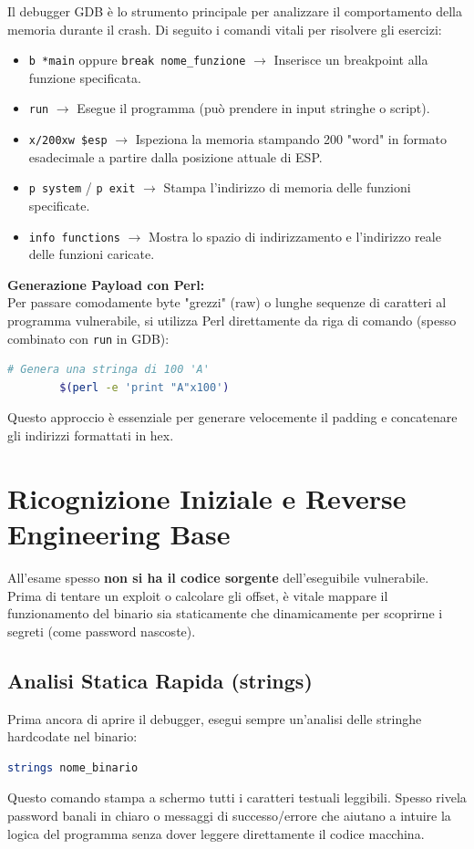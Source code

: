 \documentclass[12pt,a4paper]{report}
\begin{document}
	Il debugger GDB è lo strumento principale per analizzare il comportamento della memoria durante il crash. Di seguito i comandi vitali per risolvere gli esercizi:
	\begin{itemize}
		\item \texttt{b *main} oppure \texttt{break nome\_funzione} $\rightarrow$ Inserisce un breakpoint alla funzione specificata.
		\item \texttt{run} $\rightarrow$ Esegue il programma (può prendere in input stringhe o script).
		\item \texttt{x/200xw \$esp} $\rightarrow$ Ispeziona la memoria stampando 200 "word" in formato esadecimale a partire dalla posizione attuale di ESP.
		\item \texttt{p system} / \texttt{p exit} $\rightarrow$ Stampa l'indirizzo di memoria delle funzioni specificate.
		\item \texttt{info functions} $\rightarrow$ Mostra lo spazio di indirizzamento e l'indirizzo reale delle funzioni caricate.
	\end{itemize}
	\textbf{Generazione Payload con Perl:}\\
	Per passare comodamente byte "grezzi" (raw) o lunghe sequenze di caratteri al programma vulnerabile, si utilizza Perl direttamente da riga di comando (spesso combinato con \texttt{run} in GDB):
	\begin{lstlisting}[language=bash]
		# Genera una stringa di 100 'A'
		$(perl -e 'print "A"x100')
	\end{lstlisting}
	Questo approccio è essenziale per generare velocemente il padding e concatenare gli indirizzi formattati in hex.
	
	\section{Ricognizione Iniziale e Reverse Engineering Base}
	
	All'esame spesso \textbf{non si ha il codice sorgente} dell'eseguibile vulnerabile. Prima di tentare un exploit o calcolare gli offset, è vitale mappare il funzionamento del binario sia staticamente che dinamicamente per scoprirne i segreti (come password nascoste).
	
	\subsection{Analisi Statica Rapida (strings)}
	Prima ancora di aprire il debugger, esegui sempre un'analisi delle stringhe hardcodate nel binario:
	\begin{lstlisting}[language=bash]
		strings nome_binario
	\end{lstlisting}
	Questo comando stampa a schermo tutti i caratteri testuali leggibili. Spesso rivela password banali in chiaro o messaggi di successo/errore che aiutano a intuire la logica del programma senza dover leggere direttamente il codice macchina.
	
\end{document}
